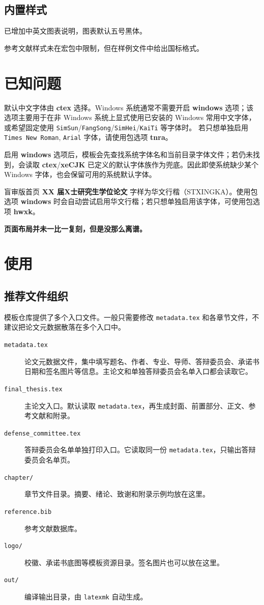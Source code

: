 \documentclass{ctxdoc}
\begin{document}
    \subsection{内置样式}
    已增加中英文图表说明，图表默认五号黑体。

    参考文献样式未在宏包中限制，但在样例文件中给出国标格式。

    \section{已知问题}
    默认中文字体由 \textbf{ctex} 选择。Windows 系统通常不需要开启 \textbf{windows} 选项；该选项主要用于在非 Windows 系统上显式使用已安装的 Windows 常用中文字体，或希望固定使用 \texttt{SimSun}/\texttt{FangSong}/\texttt{SimHei}/\texttt{KaiTi} 等字体时。
    若只想单独启用 \texttt{Times New Roman}, \texttt{Arial} 字体，请使用包选项 \textbf{tnra}。

    启用 \textbf{windows} 选项后，模板会先查找系统字体名和当前目录字体文件；若仍未找到，会读取 \textbf{ctex}/\textbf{xeCJK} 已定义的默认字体族作为兜底。因此即使系统缺少某个 Windows 字体，也会保留可用的系统默认字体。

    盲审版首页 \textbf{XX 届X士研究生学位论文} 字样为华文行楷（STXINGKA）。使用包选项 \textbf{windows} 时会自动尝试启用华文行楷；若只想单独启用该字体，可使用包选项 \textbf{hwxk}。


    \textbf{页面布局并未一比一复刻，但是没那么离谱。}


    \section{使用}
    \subsection{推荐文件组织}

    模板仓库提供了多个入口文件。一般只需要修改 \texttt{metadata.tex} 和各章节文件，不建议把论文元数据散落在多个入口中。

    \begin{description}
        \item[\texttt{metadata.tex}] 论文元数据文件，集中填写题名、作者、专业、导师、答辩委员会、承诺书日期和签名图片等信息。主论文和单独答辩委员会名单入口都会读取它。
        \item[\texttt{final\_thesis.tex}] 主论文入口。默认读取 \texttt{metadata.tex}，再生成封面、前置部分、正文、参考文献和附录。
        \item[\texttt{defense\_committee.tex}] 答辩委员会名单单独打印入口。它读取同一份 \texttt{metadata.tex}，只输出答辩委员会名单页。
        \item[\texttt{chapter/}] 章节文件目录。摘要、绪论、致谢和附录示例均放在这里。
        \item[\texttt{reference.bib}] 参考文献数据库。
        \item[\texttt{logo/}] 校徽、承诺书底图等模板资源目录。签名图片也可以放在这里。
        \item[\texttt{out/}] 编译输出目录，由 \texttt{latexmk} 自动生成。
    \end{description}
\end{document}
